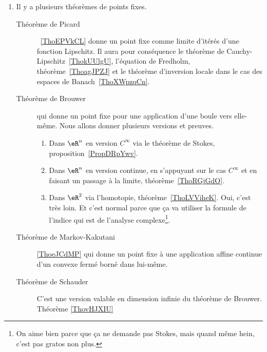         \label{THEMEooWAYJooUSnmMh}
\begin{enumerate}
	\item
	      Il y a plusieurs théorèmes de points fixes.
	      \begin{description}
		      \item[Théorème de Picard]~\ref{ThoEPVkCL} donne un point fixe comme limite d'itérés d'une fonction Lipschitz. Il aura pour conséquence le théorème de Cauchy-Lipschitz~\ref{ThokUUlgU}, l'équation de Fredholm, théorème~\ref{ThoagJPZJ} et le théorème d'inversion locale dans le cas des espaces de Banach~\ref{ThoXWpzqCn}.
		      \item[Théorème de Brouwer] qui donne un point fixe pour une application d'une boule vers elle-même. Nous allons donner plusieurs versions et preuves.
			      \begin{enumerate}
				      \item
				            Dans \( \eR^n\) en version \( C^{\infty}\) via le théorème de Stokes, proposition~\ref{PropDRpYwv}.
				      \item
				            Dans \( \eR^n\) en version continue, en s'appuyant sur le cas \( C^{\infty}\) et en faisant un passage à la limite, théorème~\ref{ThoRGjGdO}.
				      \item
				            Dans \( \eR^2\) via l'homotopie, théorème~\ref{ThoLVViheK}. Oui, c'est très loin. Et c'est normal parce que ça va utiliser la formule de l'indice qui est de l'analyse complexe\footnote{On aime bien parce que ça ne demande pas Stokes, mais quand même hein, c'est pas gratos non plus.}.
			      \end{enumerate}
			      \item[Théorème de Markov-Kakutani]\ref{ThoeJCdMP} qui donne un point fixe à une application affine continue d'un convexe fermé borné dans lui-même.
		      \item[Théorème de Schauder] C'est une version valable en dimension infinie du théorème de Brouwer. Théorème \ref{ThovHJXIU}
	      \end{description}


\end{enumerate}
